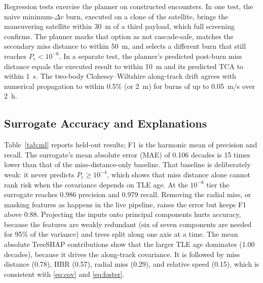 \documentclass[conference]{IEEEtran}
\newcommand{\Pc}{P_c}
\begin{document}
Regression tests exercise the planner on constructed encounters. In one test,
the naive minimum-$\Delta v$ burn, executed on a clone of the satellite, brings
the maneuvering satellite within 30~m of a third payload, which full screening
confirms. The planner marks that option as not cascade-safe, matches the
secondary miss distance to within 50~m, and selects a different burn that still
reaches $\Pc<10^{-6}$. In a separate test, the planner's predicted post-burn
miss distance equals the executed result to within 10~m and its predicted TCA
to within 1~s. The two-body Clohessy--Wiltshire along-track drift agrees with
numerical propagation to within 0.5\% (or 2~m) for burns of up to 0.05~m/s over
2~h.

\subsection{Surrogate Accuracy and Explanations}

Table~\ref{tab:ml} reports held-out results; F1 is the harmonic mean of
precision and recall. The surrogate's mean absolute error (MAE) of 0.106
decades is 15 times lower than that of the miss-distance-only baseline. That
baseline is deliberately weak: it never predicts $\Pc\ge10^{-4}$, which shows
that miss distance alone cannot rank risk when the covariance depends on TLE
age. At the $10^{-6}$ tier the surrogate reaches 0.986 precision and 0.979
recall. Removing the radial miss, or masking features as happens in the live
pipeline, raises the error but keeps F1 above 0.88. Projecting the inputs onto
principal components hurts accuracy, because the features are weakly redundant
(six of seven components are needed for 95\% of the variance) and trees split
along one axis at a time. The mean absolute TreeSHAP contributions show that
the larger TLE age dominates (1.00 decades), because it drives the along-track
covariance. It is followed by miss distance (0.78), HBR (0.57), radial miss
(0.29), and relative speed (0.15), which is consistent with \eqref{eq:cov} and
\eqref{eq:foster}.
\end{document}

